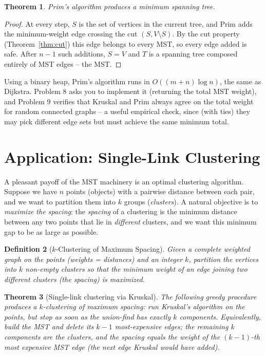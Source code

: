 \documentclass[11pt]{article}
\newtheorem{theorem}{Theorem}[section]
\newtheorem{definition}[theorem]{Definition}
\begin{document}
\begin{theorem}
Prim's algorithm produces a minimum spanning tree.
\end{theorem}

\begin{proof}
At every step, $S$ is the set of vertices in the current tree, and Prim adds the
minimum-weight edge crossing the cut $(S, V \setminus S)$. By the cut property
(Theorem~\ref{thm:cut}) this edge belongs to every MST, so every edge added is
safe. After $n-1$ such additions, $S = V$ and $T$ is a spanning tree composed
entirely of MST edges -- the MST.
\end{proof}

Using a binary heap, Prim's algorithm runs in $O((m+n)\log n)$, the same as
Dijkstra. Problem 8 asks you to implement it (returning the total MST weight),
and Problem 9 verifies that Kruskal and Prim always agree on the total weight
for random connected graphs -- a useful empirical check, since (with ties) they
may pick different edge sets but must achieve the same minimum total.

\section{Application: Single-Link Clustering}

A pleasant payoff of the MST machinery is an optimal clustering algorithm.
Suppose we have $n$ points (objects) with a pairwise distance between each pair,
and we want to partition them into $k$ groups (\emph{clusters}). A natural
objective is to \emph{maximize the spacing}: the \emph{spacing} of a clustering
is the minimum distance between any two points that lie in \emph{different}
clusters, and we want this minimum gap to be as large as possible.

\begin{definition}[$k$-Clustering of Maximum Spacing]
Given a complete weighted graph on the points (weights = distances) and an
integer $k$, partition the vertices into $k$ non-empty clusters so that the
minimum weight of an edge joining two different clusters (the \emph{spacing}) is
maximized.
\end{definition}

\begin{theorem}[Single-link clustering via Kruskal]
The following greedy procedure produces a $k$-clustering of maximum spacing: run
Kruskal's algorithm on the points, but \emph{stop} as soon as the union-find has
exactly $k$ components. Equivalently, build the MST and delete its $k-1$
most-expensive edges; the remaining $k$ components are the clusters, and the
spacing equals the weight of the $(k-1)$-th most expensive MST edge (the next
edge Kruskal would have added).
\end{theorem}
\end{document}
